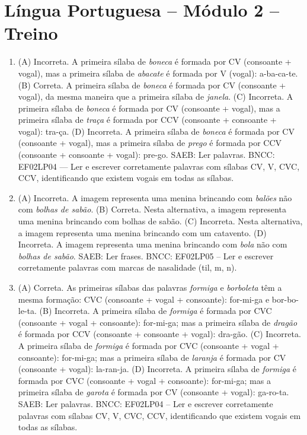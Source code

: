\section*{Língua Portuguesa – Módulo 2 – Treino}

\begin{enumerate}
\item
(A) Incorreta. A primeira sílaba de \textit{boneca} é formada por CV 
(consoante + vogal), mas a primeira sílaba de \textit{abacate} é formada
por V (vogal): a-ba-ca-te.
(B) Correta. A primeira sílaba de \textit{boneca} é formada por CV 
(consoante + vogal), da mesma maneira que a primeira sílaba de 
\textit{janela}. 
(C) Incorreta. A primeira sílaba de \textit{boneca} é formada por CV 
(consoante + vogal), mas a primeira sílaba de \textit{traça} é formada
por CCV (consoante + consoante + vogal): tra-ça.
(D) Incorreta. A primeira sílaba de \textit{boneca} é formada por CV 
(consoante + vogal), mas a primeira sílaba de \textit{prego} é formada
por CCV (consoante + consoante + vogal): pre-go.
SAEB: Ler palavras.
BNCC: EF02LP04 --- Ler e escrever corretamente palavras com
sílabas CV, V, CVC, CCV, identificando que existem vogais em todas as
sílabas.

\item
(A) Incorreta. A imagem representa uma menina brincando com \textit{balões}
não com \textit{bolhas de sabão}.
(B) Correta. Nesta alternativa, a imagem representa uma menina brincando
com bolhas de sabão.
(C) Incorreta. Nesta alternativa, a imagem representa uma menina brincando
com um catavento.
(D) Incorreta. A imagem representa uma menina brincando com \textit{bola}
não com \textit{bolhas de sabão}.
SAEB: Ler frases.
BNCC: EF02LP05 -- Ler e escrever corretamente palavras com marcas de
nasalidade (til, m, n).

\item
(A) Correta. As primeiras sílabas das palavras \textit{formiga} e 
\textit{borboleta} têm a mesma formação: CVC (consoante + vogal + 
consoante): for-mi-ga e bor-bo-le-ta.   
(B) Incorreta. A primeira sílaba de \textit{formiga} é formada
por CVC (consoante + vogal + consoante): for-mi-ga; mas a primeira 
sílaba de \textit{dragão} é formada por CCV (consoante + consoante + 
vogal): dra-gão.
(C) Incorreta. A primeira sílaba de \textit{formiga} é formada
por CVC (consoante + vogal + consoante): for-mi-ga; mas a primeira 
sílaba de \textit{laranja} é formada por CV (consoante + vogal): 
la-ran-ja.
(D) Incorreta. A primeira sílaba de \textit{formiga} é formada
por CVC (consoante + vogal + consoante): for-mi-ga; mas a primeira 
sílaba de \textit{garota} é formada por CV (consoante + vogal): 
ga-ro-ta.
SAEB: Ler palavras.
BNCC: EF02LP04 -- Ler e escrever corretamente palavras com
sílabas CV, V, CVC, CCV, identificando que existem vogais em todas as
sílabas.
\end{enumerate}

